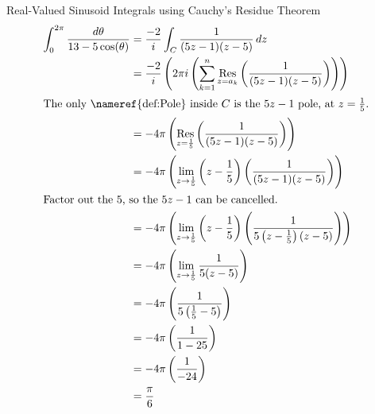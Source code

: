 \begin{example}{Real-Valued Sinusoid Integrals using Cauchy's Residue Theorem}
  \begin{align*}
    \int_{0}^{2\pi} \frac{d\theta}{13 - 5\cos(\theta)} &= \frac{-2}{i} \int_{C} \frac{1}{(5z-1) (z-5)} \, dz \\
                                                       &= \frac{-2}{i} \left( 2 \pi i \left( \sum_{k=1}^{n} \Residue{\frac{1}{(5z-1) (z-5)}}{z=a_{k}} \right) \right) \\
    \intertext{The only \nameref{def:Pole} inside $C$ is the $5z-1$ pole, at $z = \frac{1}{5}$.}
                                                       &= -4 \pi \left( \Residue{\frac{1}{(5z-1) (z-5)}}{z=\frac{1}{5}} \right) \\
                                                       &= -4 \pi \left( \lim\limits_{z \to \frac{1}{5}} \left( z-\frac{1}{5} \right) \left( \frac{1}{(5z-1) (z-5)} \right) \right) \\
    \shortintertext{Factor out the $5$, so the $5z-1$ can be cancelled.}
                                                       &= -4 \pi \left( \lim\limits_{z \to \frac{1}{5}} \left( z-\frac{1}{5} \right) \left( \frac{1}{5 \left( z-\frac{1}{5} \right) (z-5)} \right) \right) \\
                                                       &= -4 \pi \left( \lim\limits_{z \to \frac{1}{5}} \frac{1}{5(z-5)} \right) \\
                                                       &= -4 \pi \left( \frac{1}{5 \left( \frac{1}{5} - 5 \right)} \right) \\
                                                       &= -4 \pi \left( \frac{1}{1-25} \right) \\
                                                       &= -4 \pi \left(\frac{1}{-24} \right) \\
                                                       &= \frac{\pi}{6}
  \end{align*}
\end{example}

